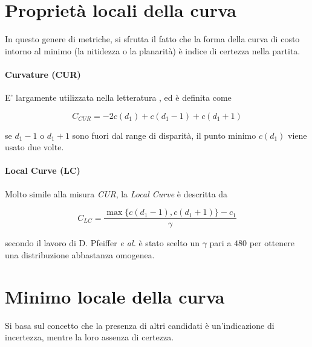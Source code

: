 \documentclass[12pt]{report}
\begin{document}
		
		
		\section{Proprietà locali della curva}
		\label{sec:localProperties}	
			In questo genere di metriche, si sfrutta il fatto che la forma della curva di costo intorno al minimo (la nitidezza o la planarità) è indice di certezza nella partita.
			
			\paragraph{Curvature (CUR)}
			\label{par:curvature}
			
				E' largamente utilizzata nella letteratura \cite{indoors_outdoors}, ed è definita come
				
				\begin{equation}
					C_{CUR}=-2c(d_{1})+c(d_{1}-1)+c(d_{1}+1)
					\label{eq:CUR}
				\end{equation} 
			
				\noindent se $d_{1}-1$ o $d_{1}+1$ sono fuori dal range di disparità, il punto minimo $c(d_{1})$ viene usato due volte.
			
			
			\paragraph{Local Curve (LC)} 
			\label{par:local}
			
				Molto simile alla misura \textit{CUR}, la \textit{Local Curve} è descritta da
				
				\begin{equation}
					C_{LC}=\frac {\max\bigr\{ c(d_{1}-1) ,c(d_{1}+1) \bigr\} - c_{1}} {\gamma}
					\label{eq:LC}
				\end{equation}
				
				\noindent secondo il lavoro di D. Pfeiffer \textit{e al.}\cite{mercedes} è stato scelto un $\gamma$ pari a $480$ per ottenere una distribuzione abbastanza omogenea.
			
			
			
		\section{Minimo locale della curva}
		\label{sec:localMinima}	
		
			Si basa sul concetto che la presenza di altri candidati è un'indicazione di incertezza, mentre la loro assenza di certezza.
			
\end{document}
